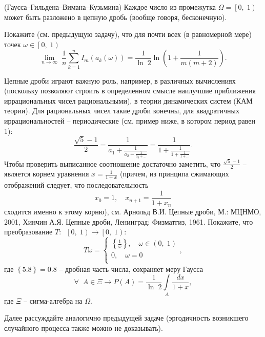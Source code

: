 \begin{problem} (Гаусса--Гильдена--Вимана--Кузьмина) Каждое число из промежутка $\Omega =\left[ {0,\;1} 
\right)$ может быть разложено в цепную дробь (вообще говоря, бесконечную). 

Покажите (см. предыдущую задачу), что для почти всех (в 
равномерной мере) точек $\omega \in \left[ {0,\;1} \right)$
\[
\mathop {\lim }\limits_{n\to \infty } \;\frac{1}{n}\sum\limits_{k=1}^n {I_m 
\left( {a_k \left( \omega \right)} \right)} =\frac{1}{\ln \;2}\ln \left( 
{1+\frac{1}{m\left( {m+2} \right)}} \right).
\]
\end{problem}
\begin{ordre}
Цепные дроби играют важную роль, например, в различных вычислениях 
(поскольку позволяют строить в определенном смысле наилучшие приближения 
иррациональных чисел рациональными), в теории динамических систем (КАМ 
теории). Для рациональных чисел такие дроби конечны, для квадратичных 
иррациональностей -- периодические (см. пример ниже, в котором период равен 
1):
\[
\frac{\sqrt 5 -1}{2}=\frac{1}{a_1 +\frac{1}{a_2 +\frac{1}{a_3 
+...}}}=\frac{1}{1+\frac{1}{1+\frac{1}{1+...}}}.
\]
Чтобы проверить выписанное соотношение достаточно заметить, 
что $\frac{\sqrt 5 -1}{2}$ -- является корнем уравнения $x=\frac{1}{1+x}$ 
(причем, из принципа сжимающих отображений следует, что последовательность 
$$x_0 =1,\quad x_{n+1} =\frac{1}{1+x_n }$$ сходится именно к этому корню),
см.  Арнольд В.И. Цепные дроби, М.: МЦНМО, 
2001, Хинчин А.Я. Цепные дроби, Ленинград: Физматгиз, 1961. Покажите, что преобразование $T:\;\;\left[ 
{0,\;1} \right)\to \left[ {0,\;1} \right)$:
\[
T\omega =\left\{ {\begin{array}{l}
 \left\{ {\frac{1}{\omega }} \right\},\quad \omega \in \left( {0,\;1} 
\right) \\ 
 0,\quad \omega =0 \\ 
 \end{array}} \right.,
\]
где $\left\{ {5.8} \right\}=0.8$ -- дробная часть числа, сохраняет меру Гаусса
\[
\forall \;\;A\in \Xi \to P\left( A \right)=\frac{1}{\ln \;2}\int\limits_A 
{\frac{dx}{1+x}} ,
\]
где $\Xi$ -- сигма-алгебра на $\Omega$.

Далее рассуждайте аналогично предыдущей задаче (эргодичность возникшего 
случайного процесса также можно не доказывать).
\end{ordre}



